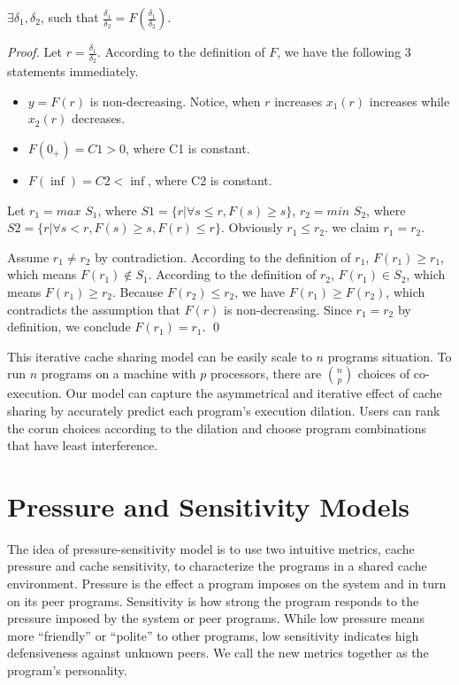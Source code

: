 \begin{theorem} 
$\exists \delta_1,\delta_2$, such that $\frac{\delta_1}{\delta_2}= F(\frac{\delta_1}{\delta_2})$.
\end {theorem}
\begin{proof}
Let $r=\frac{\delta_1}{\delta_2}$. 
According to the definition of $F$, we have the following 3 statements immediately. 
\begin{itemize}
\item $y=F(r)$ is non-decreasing. Notice, when $r$ increases $x_1(r)$ increases while $x_2(r)$ decreases. 
\item $F(0_+)=C1>0$, where C1 is constant.
\item $F(\inf)=C2<\inf$, where C2 is constant.
\end{itemize}
Let $r_1=max$ $S_1$, where $S1=\{r|\forall s \le r, F(s) \ge s\}$,  
$r_2=min$ $S_2$, where $S2=\{r|\forall s<r, F(s) \ge s, F(r) \le r\}$. 
Obviously $r_1 \le r_2$. we claim $r_1=r_2$.
\indent

Assume $r_1 \ne r_2$ by contradiction.
According to the definition of $r_1$, $F(r_1) \ge r_1$,
which means $F(r_1) \not\in S_1$.
According to the definition of $r_2$, $F(r_1) \in S_2$, which means 
$F(r_1) \ge r_2$.  Because $F(r_2) \le r_2$, we have $F(r_1) \ge F(r_2)$, 
which contradicts the assumption that $F(r)$ is non-decreasing.
Since $r_1=r_2$ by definition, we conclude $F(r_1)=r_1$.
\qed
\end{proof}

This iterative cache sharing model can be easily scale to $n$ programs
situation. To run $n$ programs on a machine with $p$ processors, there
are $n \choose p$ choices of co-execution. Our model can capture the
asymmetrical and iterative effect of cache sharing by accurately
predict each program's execution dilation. Users can rank the corun
choices according to the dilation and choose program combinations
that have least interference. 

\section{Pressure and Sensitivity Models}

The idea of pressure-sensitivity model is to use two intuitive
metrics, cache pressure and cache sensitivity, to characterize the
programs in a shared cache environment. Pressure is the effect a
program imposes on the system and in turn on its peer
programs. Sensitivity is how strong the program responds to the
pressure imposed by the system or peer programs. While low
pressure means more ``friendly'' or ``polite'' to other programs, low
sensitivity indicates high defensiveness against unknown peers. We
call the new metrics together as the program's personality.  


